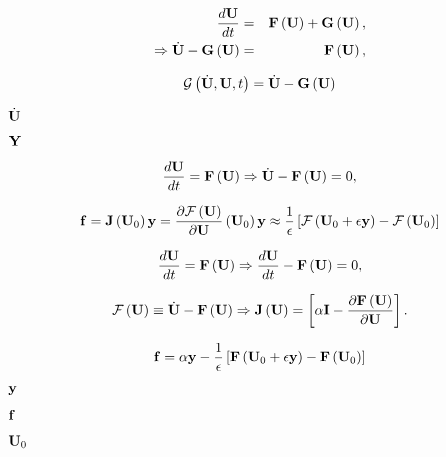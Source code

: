 \documentclass{article}
\begin{document}
\begin{eqnarray} \frac {d{\bf U}}{dt} &=& {\bf F}\left({\bf U}\right) + {\bf G}\left({\bf U}\right), \\ \Rightarrow \dot{\bf U} - {\bf G}\left({\bf U}\right) &=& {\bf F}\left({\bf U}\right), \end{eqnarray}
\pagebreak

\begin{equation} \mathcal{G}\left(\dot{\bf U},{\bf U},t\right) = \dot{\bf U} - {\bf G}\left({\bf U}\right) \end{equation}
\pagebreak

$\dot{\bf U}$
\pagebreak

${\bf Y}$
\pagebreak

\begin{equation} \frac {d{\bf U}}{dt} = {\bf F}\left({\bf U}\right) \Rightarrow \dot{\bf U} - {\bf F}\left({\bf U}\right) = 0, \end{equation}
\pagebreak

\begin{equation} {\bf f} = {\bf J}\left({\bf U}_0\right){\bf y} = \frac {\partial \mathcal{F}\left({\bf U}\right)} {\partial {\bf U}}\left({\bf U}_0\right) {\bf y} \approx \frac{1}{\epsilon} \left[ \mathcal{F}\left({\bf U}_0+\epsilon{\bf y}\right)-\mathcal{F}\left({\bf U}_0\right) \right] \end{equation}
\pagebreak

\begin{equation} \frac {d {\bf U}} {dt} = {\bf F}\left({\bf U}\right) \Rightarrow \frac {d {\bf U}} {dt} - {\bf F}\left({\bf U}\right) = 0, \end{equation}
\pagebreak

\begin{equation} \mathcal{F}\left({\bf U}\right) \equiv \dot{\bf U} - {\bf F}\left({\bf U}\right) \Rightarrow {\bf J}\left({\bf U}\right) = \left[\alpha{\bf I} - \frac {\partial {\bf F}\left({\bf U}\right)} {\partial {\bf U}} \right]. \end{equation}
\pagebreak

\begin{equation} {\bf f} = \alpha {\bf y} - \frac{1}{\epsilon} \left[ {\bf F}\left({\bf U}_0+\epsilon{\bf y}\right)-{\bf F}\left({\bf U}_0\right) \right] \end{equation}
\pagebreak

${\bf y}$
\pagebreak

$\bf f$
\pagebreak

${\bf U}_0$
\pagebreak
\end{document}
